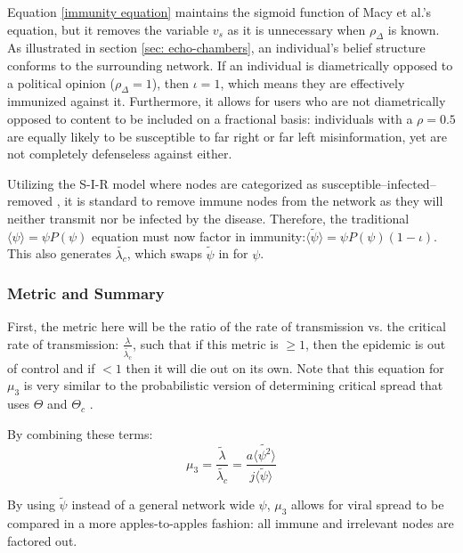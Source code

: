 \documentclass[preprint,review,12pt]{elsarticle}
\begin{document}
Equation \ref{immunity equation} maintains the sigmoid function of Macy et al.'s equation, but it removes the variable $v_s$ as it is unnecessary when $\rho_{\Delta}$ is known. As illustrated in section \ref{sec: echo-chambers}, an individual's belief structure conforms to the surrounding network. If an individual is diametrically opposed to a political opinion ($\rho_{\Delta} = 1$), then $\iota = 1$, which means they are effectively immunized against it. Furthermore, it allows for users who are not diametrically opposed to content to be included on a fractional basis: individuals with a $\rho = 0.5$ are equally likely to be susceptible to far right or far left misinformation, yet are not completely defenseless against either. 

Utilizing the S-I-R model where nodes are categorized as susceptible–infected–removed \cite{ferrari2006network,bailey1975mathematical,newman2005threshold,newman2002spread}, it is standard to remove immune nodes from the network as they will neither transmit nor be infected by the disease. Therefore, the traditional $\langle \psi \rangle = \psi P(\psi)$ equation must now factor in immunity:$\langle \tilde{\psi} \rangle =  \psi P(\psi)(1-\iota)$. This also generates $\tilde{\lambda_c}$, which swaps $\tilde{\psi}$ in for $\psi$.


\subsubsection{Metric and Summary}
First, the metric here will be the ratio of the rate of transmission vs. the critical rate of transmission: $\frac{\lambda}{\tilde{\lambda_c}}$, such that if this metric is $\geq 1$, then the epidemic is out of control and if $< 1$ then it will die out on its own. Note that this equation for $\mu_3$ is very similar to the probabilistic version of determining critical spread that uses $\Theta$ and $\Theta_c$ \cite{newman2005threshold,ferrari2006network,meyers2005network,callaway2000network,newman2002random}.

By combining these terms:
\begin{equation}
\label{mu_3 equation}
    \mu_3 = \frac{\tilde{\lambda}}{\tilde{\lambda_c}} = \frac{a \langle \tilde{\psi^2} \rangle}{j\langle \tilde{\psi} \rangle}
\end{equation}

By using $\tilde{\psi}$ instead of a general network wide $\psi$, $\mu_3$ allows for viral spread to be compared in a more apples-to-apples fashion: all immune and irrelevant nodes are factored out. 
\end{document}
